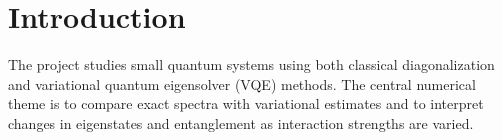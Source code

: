 \section{Introduction}


The project studies small quantum systems using both classical diagonalization and variational quantum eigensolver (VQE) methods. The central numerical theme is to compare exact spectra with variational estimates and to interpret changes in eigenstates and entanglement as interaction strengths are varied.
